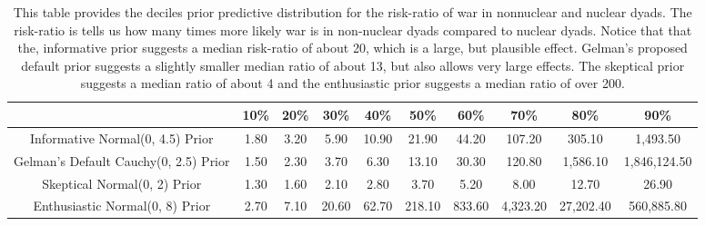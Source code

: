 \documentclass[12pt]{article}
\begin{document}
\begin{center}
\begin{table}[ht]
\centering
\begin{scriptsize}
\begin{tabular}{|cccccccccc|}
  \hline
 & 10\% & 20\% & 30\% & 40\% & 50\% & 60\% & 70\% & 80\% & 90\% \\ 
  \hline
Informative Normal(0, 4.5) Prior & 1.80 & 3.20 & 5.90 & 10.90 & 21.90 & 44.20 & 107.20 & 305.10 & 1,493.50 \\ 
  Gelman's Default Cauchy(0, 2.5) Prior & 1.50 & 2.30 & 3.70 & 6.30 & 13.10 & 30.30 & 120.80 & 1,586.10 & 1,846,124.50 \\ 
  Skeptical Normal(0, 2) Prior & 1.30 & 1.60 & 2.10 & 2.80 & 3.70 & 5.20 & 8.00 & 12.70 & 26.90 \\ 
  Enthusiastic Normal(0, 8) Prior & 2.70 & 7.10 & 20.60 & 62.70 & 218.10 & 833.60 & 4,323.20 & 27,202.40 & 560,885.80 \\ 
   \hline
\end{tabular}\caption{This table provides the deciles prior predictive distribution for the risk-ratio of war in nonnuclear and nuclear dyads. The risk-ratio is tells us how many times more likely war is in non-nuclear dyads compared to nuclear dyads. Notice that that the, informative prior suggests a median risk-ratio of about 20, which is a large, but plausible effect. Gelman's proposed default prior suggests a slightly smaller median ratio of about 13, but also allows very large effects. The skeptical prior suggests a median ratio of about 4 and the enthusiastic prior suggests a median ratio of over 200. }
\end{scriptsize}
\end{table}
\end{center}


\clearpage


\end{document}
